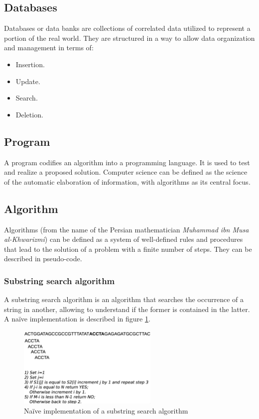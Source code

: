 	\subsection{Databases}
	Databases or data banks are collections of correlated data utilized to represent a portion of the real world.
	They are structured in a way to allow data organization and management in terms of:

	\begin{multicols}{4}
		\begin{itemize}
			\item Insertion.
			\item Update.
			\item Search.
			\item Deletion.
		\end{itemize}
	\end{multicols}

	\subsection{Program}
	A program codifies an algorithm into a programming language.
	It is used to test and realize a proposed solution.
	Computer science can be defined as the science of the automatic elaboration of information, with algorithms as its central focus.

	\subsection{Algorithm}
	Algorithms (from the name of the Persian mathematician \textit{Muhammad ibn Musa al-Khwarizmi}) can be defined as a system of well-defined rules and procedures that lead to the solution of a problem with a finite number of steps.
	They can be described in pseudo-code.

		\subsubsection{Substring search algorithm}
		A substring search algorithm is an algorithm that searches the occurrence of a string in another, allowing to understand if the former is contained in the latter.
		A na\"ive implementation is described in figure \ref{fig:substring-search-naive}.

		\begin{figure}[H]
			\centering
			\includegraphics[width=0.6\textwidth]{substring-search}
			\caption{Na\"ive implementation of a substring search algorithm}
			\label{fig:substring-search-naive}
		\end{figure}
